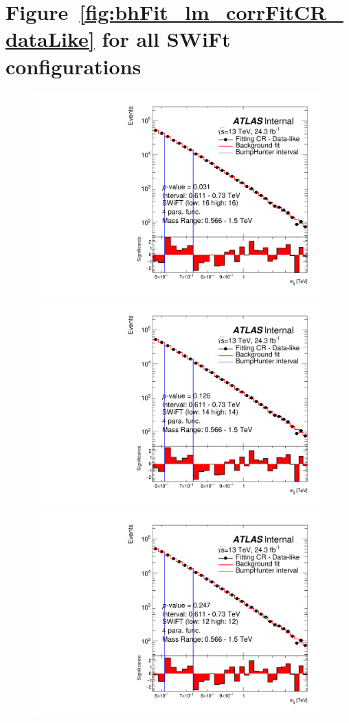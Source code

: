 \begin{figure}
{}    
\end{figure}

\clearpage

\section{Figure~\ref{fig:bhFit_lm_corrFitCR_dataLike} for all SWiFt configurations}
\vspace{5em}

\begin{figure}[!htb]
\captionsetup[subfigure]{aboveskip=0pt,justification=centering}
\centering
{} {
  \includegraphics[width=0.48\linewidth, angle=0]{figs/Dibjet/LowMass/FitStudy_min566/bhFit_corrFitCR_dataLike_v13_4para_low16_high16.pdf}
}
 {
  \includegraphics[width=0.48\linewidth, angle=0]{figs/Dibjet/LowMass/FitStudy_min566/bhFit_corrFitCR_dataLike_v13_4para_low14_high14.pdf}
}
 {
  \includegraphics[width=0.48\linewidth, angle=0]{figs/Dibjet/LowMass/FitStudy_min566/bhFit_corrFitCR_dataLike_v13_4para_low12_high12.pdf}
}
 {
}
\end{figure}

